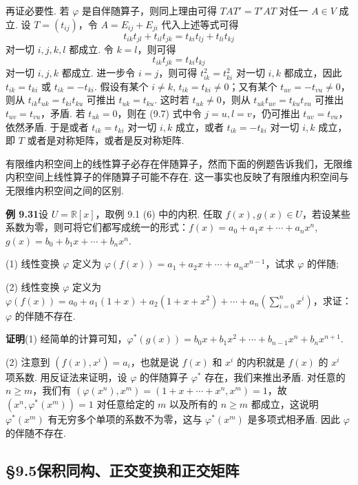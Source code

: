 \documentclass[UTF8, 12pt, fontset=fandol, oneside]{ctexart}
\begin{document}
再证必要性. 若 $\varphi$ 是自伴随算子，则同上理由可得 $TAT'=T'AT$ 对任一 $A\in V$ 成立. 设 $T=(t_{ij})$，令 $A=E_{ij}+E_{ji}$ 代入上述等式可得
\begin{equation}
t_{ik}t_{jl}+t_{il}t_{jk}=t_{ki}t_{lj}+t_{li}t_{kj}
\tag{9.7}
\end{equation}
对一切 $i,j,k,l$ 都成立. 令 $k=l$，则可得
\[
t_{ik}t_{jk}=t_{ki}t_{kj}
\]
对一切 $i,j,k$ 都成立. 进一步令 $i=j$，则可得 $t_{ik}^2=t_{ki}^2$ 对一切 $i,k$ 都成立，因此 $t_{ik}=t_{ki}$ 或 $t_{ik}=-t_{ki}$. 假设有某个 $i\ne k$, $t_{ik}=t_{ki}\ne 0$；又有某个 $t_{uv}=-t_{vu}\ne 0$，则从 $t_{ik}t_{uk}=t_{ki}t_{ku}$ 可推出 $t_{uk}=t_{ku}$. 这时若 $t_{uk}\ne 0$，则从 $t_{uk}t_{uv}=t_{ku}t_{vu}$ 可推出 $t_{uv}=t_{vu}$，矛盾. 若 $t_{uk}=0$，则在 (9.7) 式中令 $j=u,l=v$，仍可推出 $t_{uv}=t_{vu}$，依然矛盾. 于是或者 $t_{ik}=t_{ki}$ 对一切 $i,k$ 成立，或者 $t_{ik}=-t_{ki}$ 对一切 $i,k$ 成立，即 $T$ 或者是对称矩阵，或者是反对称矩阵.

有限维内积空间上的线性算子必存在伴随算子，然而下面的例题告诉我们，无限维内积空间上线性算子的伴随算子可能不存在. 这一事实也反映了有限维内积空间与无限维内积空间之间的区别.

\noindent\textbf{例 9.31}\quad 设 $U=\mathbb{R}[x]$，取例 9.1 (6) 中的内积. 任取 $f(x),g(x)\in U$，若设某些系数为零，则可将它们都写成统一的形式：$f(x)=a_0+a_1x+\cdots+a_nx^n$, $g(x)=b_0+b_1x+\cdots+b_nx^n$.

(1) 线性变换 $\varphi$ 定义为 $\varphi(f(x))=a_1+a_2x+\cdots+a_nx^{n-1}$，试求 $\varphi$ 的伴随;

(2) 线性变换 $\varphi$ 定义为 $\varphi(f(x))=a_0+a_1(1+x)+a_2(1+x+x^2)+\cdots+a_n\left(\sum_{i=0}^n x^i\right)$，求证：$\varphi$ 的伴随不存在.

\noindent\textbf{证明}\quad (1) 经简单的计算可知，$\varphi^*(g(x))=b_0x+b_1x^2+\cdots+b_{n-1}x^n+b_nx^{n+1}$.

(2) 注意到 $(f(x),x^i)=a_i$，也就是说 $f(x)$ 和 $x^i$ 的内积就是 $f(x)$ 的 $x^i$ 项系数. 用反证法来证明，设 $\varphi$ 的伴随算子 $\varphi^*$ 存在，我们来推出矛盾. 对任意的 $n\ge m$，我们有 $(\varphi(x^n),x^m)=(1+x+\cdots+x^n,x^m)=1$，故 $(x^n,\varphi^*(x^m))=1$ 对任意给定的 $m$ 以及所有的 $n\ge m$ 都成立，这说明 $\varphi^*(x^m)$ 有无穷多个单项的系数不为零，这与 $\varphi^*(x^m)$ 是多项式相矛盾. 因此 $\varphi$ 的伴随不存在.

\subsection*{§9.5\quad 保积同构、正交变换和正交矩阵}
\end{document}
